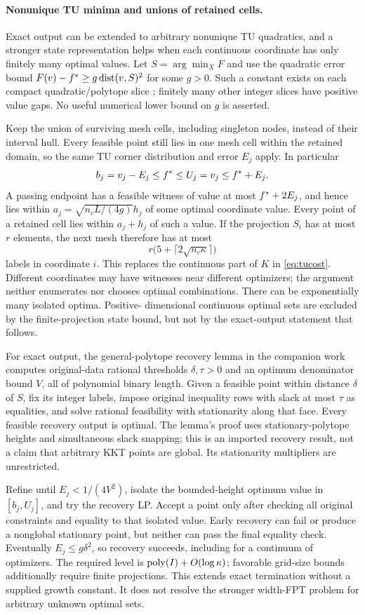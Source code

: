 \paragraph{Nonunique TU minima and unions of retained cells.}
Exact output can be extended to arbitrary nonunique TU quadratics, and
a stronger state representation helps when each continuous coordinate
has only finitely many optimal values. Let $S=\arg\min_XF$ and use the
quadratic error bound $F(v)-f^*\ge g\operatorname{dist}(v,S)^2$ for some $g>0$.
Such a constant exists on each compact quadratic/polytope slice
\cite{LuoSturm2000}; finitely many other integer slices have positive
value gaps. No useful numerical lower bound on $g$ is asserted.

Keep the union of surviving mesh cells, including singleton nodes,
instead of their interval hull. Every feasible point still lies in one
mesh cell within the retained domain, so the same TU corner distribution
and error $E_j$ apply. In particular
\[
b_j=v_j-E_j\le f^*\le U_j=v_j\le f^*+E_j.
\]
A passing endpoint has a feasible witness of value at most
$f^*+2E_j$, and hence lies within
$a_j=\sqrt{n_cL/(4g)}h_j$ of some optimal coordinate value. Every point
of a retained cell lies within $a_j+h_j$ of such a value. If the projection
$S_i$ has at most $r$ elements, the next mesh therefore has at most
\[
r\bigl(5+\lceil2\sqrt{n_c\kappa}\rceil\bigr)
\]
labels in coordinate $i$. This replaces the continuous part of $K$ in
\eqref{eq:tucost}. Different coordinates may have witnesses near different
optimizers; the argument neither enumerates nor chooses optimal
combinations. There can be exponentially many isolated optima. Positive-
dimensional continuous optimal sets are excluded by the finite-projection
state bound, but not by the exact-output statement that follows.

For exact output, the general-polytope recovery lemma in the companion
work computes original-data rational thresholds $\delta,\tau>0$ and
an optimum denominator bound $V$, all of polynomial binary length.
Given a feasible point within distance $\delta$ of $S$, fix its integer
labels, impose original inequality rows with slack at most $\tau$ as
equalities, and solve rational feasibility with stationarity along that
face. Every feasible recovery output is optimal. The lemma's proof uses
stationary-polytope heights and simultaneous slack snapping; this is an
imported recovery result, not a claim that arbitrary KKT points are global.
Its stationarity multipliers are unrestricted.

Refine until $E_j<1/(4V^2)$, isolate the bounded-height optimum value in
$[b_j,U_j]$, and try the recovery LP. Accept a point only after checking
all original constraints and equality to that isolated value. Early
recovery can fail or produce a nonglobal stationary point, but neither
can pass the final equality check. Eventually $E_j\le g\delta^2$, so
recovery succeeds, including for a continuum of optimizers. The required
level is $\operatorname{poly}(I)+O(\log\kappa)$; favorable grid-size bounds additionally
require finite projections. This extends exact termination without a
supplied growth constant. It does not resolve the stronger width-FPT
problem for arbitrary unknown optimal sets.

